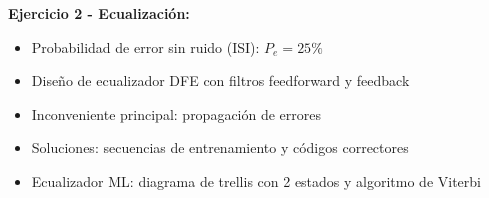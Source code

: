 \documentclass[11pt,a4paper]{article}
\begin{document}
\textbf{Ejercicio 2 - Ecualización:}
\begin{itemize}
    \item Probabilidad de error sin ruido (ISI): $P_e = 25\%$
    \item Diseño de ecualizador DFE con filtros feedforward y feedback
    \item Inconveniente principal: propagación de errores
    \item Soluciones: secuencias de entrenamiento y códigos correctores
    \item Ecualizador ML: diagrama de trellis con 2 estados y algoritmo de Viterbi
\end{itemize}
\end{document}
